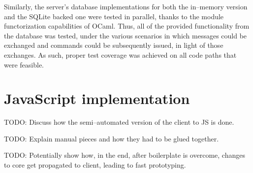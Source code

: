 Similarly, the server's database implementations for both the in--memory version and the SQLite backed one were tested in parallel, thanks to the module functorization capabilities of OCaml.
Thus, all of the provided functionality from the database was tested, under the various scenarios in which messages could be exchanged and commands could be subsequently issued, in light of those exchanges.
As such, proper test coverage was achieved on all code paths that were feasible.

\section{JavaScript implementation}
TODO: Discuss how the semi--automated version of the client to JS is done.

TODO: Explain manual pieces and how they had to be glued together.

TODO: Potentially show how, in the end, after boilerplate is overcome, changes to core get propagated to client, leading to fast prototyping.

